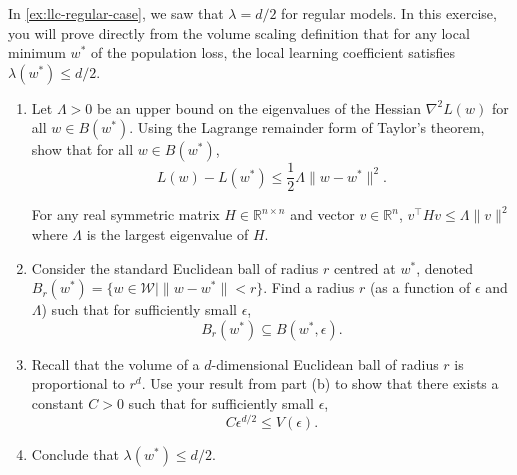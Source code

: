 \documentclass[11pt]{article}
\newcommand{\R}{\mathbb{R}}
\newcommand{\W}{\mathcal{W}}
\begin{document}
\begin{exercise}
\label{ex:lambda-upper-bound}
    In \cref{ex:llc-regular-case}, we saw that $\lambda = d/2$ for regular models. In this exercise, you will prove directly from the volume scaling definition that for any local minimum $w^*$ of the population loss, the local learning coefficient satisfies $\lambda(w^*) \leq d/2$.

    \begin{enumerate}
        \item 
             Let $\Lambda>0$ be an upper bound on the eigenvalues of the Hessian $\nabla^2 L(w)$ for all $w \in B(w^*)$. Using the Lagrange remainder form of Taylor's theorem, show that for all $w \in B(w^*)$,
            \begin{equation*}
                L(w) - L(w^*) \leq \frac{1}{2} \Lambda \|w - w^*\|^2.
            \end{equation*}
            \begin{hint}
For any real symmetric matrix $H\in\R^{n\times n}$ and vector $v\in \R^n$, $v^\top H v \leq \Lambda  \|v\|^2$ where $\Lambda$ is the largest eigenvalue of $H$.
            \end{hint}
            
        \item 
            Consider the standard Euclidean ball of radius $r$ centred at $w^*$, denoted $B_r(w^*) = \{w \in \W \mid \|w - w^*\| < r\}$. Find a radius $r$ (as a function of $\epsilon$ and $\Lambda$) such that for sufficiently small $\epsilon$,
            \begin{equation*}
                B_r(w^*) \subseteq B(w^*, \epsilon).
            \end{equation*}
            
        \item 
            Recall that the volume of a $d$-dimensional Euclidean ball of radius $r$ is proportional to $r^d$. Use your result from part (b) to show that there exists a constant $C > 0$ such that for sufficiently small $\epsilon$,
            \begin{equation*}
                  C \epsilon^{d/2} \leq V(\epsilon).
            \end{equation*}
            
        \item 
            Conclude that $\lambda(w^*) \leq d/2$. 
    \end{enumerate} 
    
\end{exercise}
\end{document}
